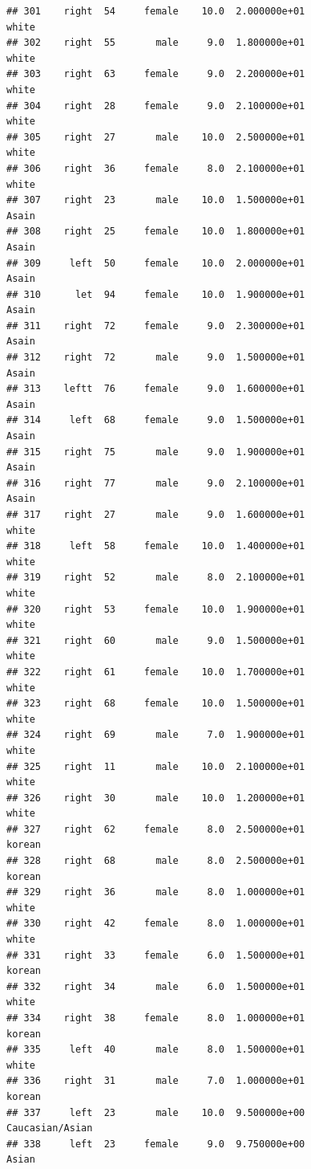 \documentclass[]{article}
\begin{document}
\begin{verbatim}
## 301    right  54     female    10.0  2.000000e+01              white
## 302    right  55       male     9.0  1.800000e+01              white
## 303    right  63     female     9.0  2.200000e+01              white
## 304    right  28     female     9.0  2.100000e+01              white
## 305    right  27       male    10.0  2.500000e+01              white
## 306    right  36     female     8.0  2.100000e+01              white
## 307    right  23       male    10.0  1.500000e+01              Asain
## 308    right  25     female    10.0  1.800000e+01              Asain
## 309     left  50     female    10.0  2.000000e+01              Asain
## 310      let  94     female    10.0  1.900000e+01              Asain
## 311    right  72     female     9.0  2.300000e+01              Asain
## 312    right  72       male     9.0  1.500000e+01              Asain
## 313    leftt  76     female     9.0  1.600000e+01              Asain
## 314     left  68     female     9.0  1.500000e+01              Asain
## 315    right  75       male     9.0  1.900000e+01              Asain
## 316    right  77       male     9.0  2.100000e+01              Asain
## 317    right  27       male     9.0  1.600000e+01              white
## 318     left  58     female    10.0  1.400000e+01              white
## 319    right  52       male     8.0  2.100000e+01              white
## 320    right  53     female    10.0  1.900000e+01              white
## 321    right  60       male     9.0  1.500000e+01              white
## 322    right  61     female    10.0  1.700000e+01              white
## 323    right  68     female    10.0  1.500000e+01              white
## 324    right  69       male     7.0  1.900000e+01              white
## 325    right  11       male    10.0  2.100000e+01              white
## 326    right  30       male    10.0  1.200000e+01              white
## 327    right  62     female     8.0  2.500000e+01             korean
## 328    right  68       male     8.0  2.500000e+01             korean
## 329    right  36       male     8.0  1.000000e+01              white
## 330    right  42     female     8.0  1.000000e+01              white
## 331    right  33     female     6.0  1.500000e+01             korean
## 332    right  34       male     6.0  1.500000e+01              white
## 334    right  38     female     8.0  1.000000e+01             korean
## 335     left  40       male     8.0  1.500000e+01              white
## 336    right  31       male     7.0  1.000000e+01             korean
## 337     left  23       male    10.0  9.500000e+00    Caucasian/Asian
## 338     left  23     female     9.0  9.750000e+00              Asian

\end{verbatim}
\end{document}

